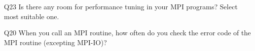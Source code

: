 \begin{description}%
\item{Q23} Is there any room for performance tuning in your MPI programs? Select most suitable one.%
\item{Q20} When you call an MPI routine, how often do you check the error code of the MPI routine  (excepting MPI-IO)?%
\end{description}%
